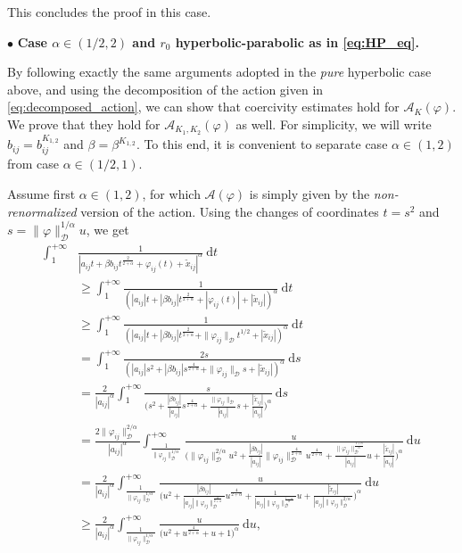 \documentclass[a4paper,10pt]{amsart}
\newcommand{\ud}{\mathrm{d}}
\theoremstyle{plain}
\theoremstyle{definition}
\numberwithin{equation}{section}
\numberwithin{thm}{section}
\begin{document}
This concludes the proof in this case.

\noindent $\bullet$ {\bf Case $\alpha\in (1/2,2)$ and $r_0$ hyperbolic-parabolic as in \eqref{eq:HP_eq}.}

By following exactly the same arguments adopted in the {\em pure} hyperbolic case above, and using the decomposition of the action given in \eqref{eq:decomposed_action}, we can show that coercivity estimates hold for $\mathcal{A}_K(\varphi)$. We prove that they hold for $\mathcal{A}_{K_1,K_2}(\varphi)$ as well. For simplicity, we will write $b_{ij}=b_{ij}^{K_{1,2}}$ and $\beta=\beta^{K_{1,2}}$. To this end, it is convenient to separate case $\alpha \in (1,2)$ from case $\alpha \in (1/2,1)$.

Assume first $\alpha \in (1,2)$, for which $\mathcal{A}(\varphi)$ is simply given by the {\em non-renormalized} version of the action.  Using the changes of coordinates $t=s^2$ and $s=\|\varphi\|_\mathcal{D}^{1/\alpha}u$, we get
\[
\begin{split}
    \int_{1}^{+\infty} &\frac{1}{|a_{ij}t + \beta b_{ij}t^{\frac{2}{2+\alpha}} + \varphi_{ij}(t) + \tilde x_{ij}|^\alpha}\ \ud t \\
    &\ge \int_{1}^{+\infty} \frac{1}{(|a_{ij}|t + |\beta b_{ij}|t^{\frac{2}{2+\alpha}}+ |\varphi_{ij}(t)| + |\tilde x_{ij}|)^\alpha}\ \ud t\\
    & \ge \int_{1}^{+\infty} \frac{1}{(|a_{ij}|t+ |\beta b_{ij}|t^{\frac{2}{2+\alpha}} + \|\varphi_{ij}\|_\mathcal{D}t^{1/2} + |\tilde x_{ij}|)^\alpha}\ \ud t\\
    & = \int_{1}^{+\infty} \frac{2s}{(|a_{ij}|s^2 + |\beta b_{ij}|s^{\frac{4}{2+\alpha}} + \|\varphi_{ij}\|_\mathcal{D}s + |\tilde x_{ij}|)^\alpha}\ \ud s\\
    & =\frac{2}{|a_{ij}|^\alpha} \int_{1}^{+\infty} \frac{s}{\big(s^2 + \frac{|\beta b_{ij}|}{|a_{ij}|}s^{\frac{4}{2+\alpha}} + \frac{\|\varphi_{ij}\|_\mathcal{D}}{|a_{ij}|}s + \frac{|\tilde x_{ij}|}{|a_{ij}|}\big)^\alpha}\ \ud s\\
    & = \frac{2\|\varphi_{ij}\|_\mathcal{D}^{2/\alpha}}{|a_{ij}|^\alpha} \int_{\frac{1}{\|\varphi_{ij}\|_\mathcal{D}^{1/\alpha}}}^{+\infty}
    \frac{u}{\bigg(\|\varphi_{ij}\|_\mathcal{D}^{2/\alpha}u^2 + \frac{|\beta b_{ij}|}{|a_{ij}|}\|\varphi_{ij}\|_\mathcal{D}^{\frac{4}{2+\alpha}}u^{\frac{4}{2+\alpha}}+\frac{\|\varphi_{ij}\|_\mathcal{D}^{\frac{1+\alpha}{\alpha}}}{|a_{ij}|}u+\frac{|\tilde x_{ij}|}{|a_{ij}|}\bigg)^\alpha}\ \ud u\\
    & = \frac{2}{|a_{ij}|^\alpha} \int_{\frac{1}{\|\varphi_{ij}\|_\mathcal{D}^{1/\alpha}}}^{+\infty}
    \frac{u}{\bigg(u^2 + \frac{|\beta b_{ij}|}{|a_{ij}|\|\varphi_{ij}\|_\mathcal{D}^{\frac{\alpha}{2+\alpha}}}u^{\frac{4}{2+\alpha}}+\frac{1}{|a_{ij}|\|\varphi_{ij}\|_\mathcal{D}^{\frac{1-\alpha}{\alpha}}}u+\frac{|\tilde x_{ij}|}{|a_{ij}|\|\varphi_{ij}\|_\mathcal{D}^{2/\alpha}}\bigg)^\alpha}\ \ud u\\
    &\ge \frac{2}{|a_{ij}|^\alpha} \int_{\frac{1}{\|\varphi_{ij}\|_\mathcal{D}^{1/\alpha}}}^{+\infty}
    \frac{u}{\bigg(u^2 + u^{\frac{4}{2+\alpha}}+u+1\bigg)^\alpha}\ \ud u,
\end{split}
\]
\end{document}
